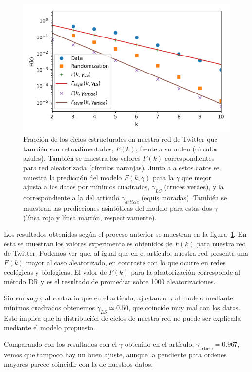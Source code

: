 \documentclass[1p]{elsarticle}
\begin{document}
\begin{figure}
    \centering
    \includegraphics[width=0.5\paperwidth]{F_sevaseviene.png}
    \caption{Fracción de los ciclos estructurales en nuestra red de Twitter que también son retroalimentados, $F(k)$, frente a su orden (círculos azules). También se muestra los valores $F(k)$ correspondientes para red aleatorizada (círculos naranjas). Junto a a estos datos se muestra la predicción del modelo $F(k, \gamma)$ para la $\gamma$ que mejor ajusta a los datos por mínimos cuadrados, $\gamma_{LS}$ (cruces verdes), y la correspondiente a la del artículo $\gamma_{article}$ (equis moradas). También se muestran las predicciones asintóticas del modelo para estas dos $\gamma$ (línea roja y línea marrón, respectivamente).}
    \label{fig:sevaseviene_F}
\end{figure}

    Los resultados obtenidos según el proceso anterior se muestran en la figura~\ref{fig:sevaseviene_F}.
    En ésta se muestran los valores experimentales obtenidos de $F(k)$ para nuestra red de Twitter. 
    Podemos ver que, al igual que en el artículo, nuestra red presenta una $F(k)$ mayor al caso aleatorizado, en contraste con lo que ocurre en redes ecológicas y biológicas. 
    El valor de $F(k)$ para la aleatorización corresponde al método DR y es el resultado de promediar sobre 1000 aleatorizaciones.

    Sin embargo, al contrario que en el artículo, ajustando $\gamma$ al modelo mediante mínimos cuadrados obtenemos $\gamma_{LS} \simeq 0.50$, que coincide muy mal con los datos.
    Esto implica que la distribución de ciclos de nuestra red no puede ser explicada mediante el modelo propuesto.

    Comparando con los resultados con el $\gamma$ obtenido en el artículo, $\gamma_{\textrm{article}} = 0.967$, vemos que tampoco hay un buen ajuste, aunque la pendiente para ordenes mayores parece coincidir con la de nuestros datos.
\end{document}
